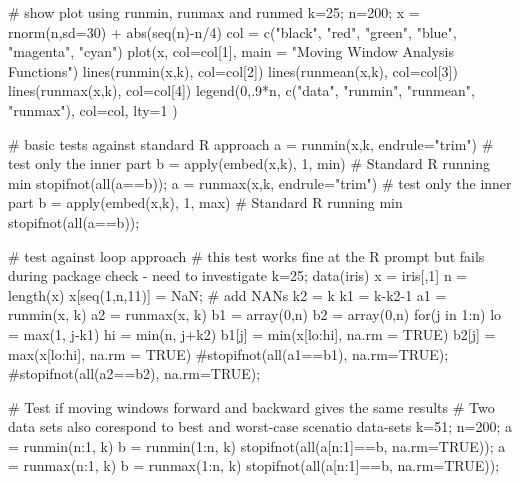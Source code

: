 \begin{Examples}
\begin{ExampleCode}
  # show plot using runmin, runmax and runmed
  k=25; n=200;
  x = rnorm(n,sd=30) + abs(seq(n)-n/4)
  col = c("black", "red", "green", "blue", "magenta", "cyan")
  plot(x, col=col[1], main = "Moving Window Analysis Functions")
  lines(runmin(x,k), col=col[2])
  lines(runmean(x,k), col=col[3])
  lines(runmax(x,k), col=col[4])
  legend(0,.9*n, c("data", "runmin", "runmean", "runmax"), col=col, lty=1 )

  # basic tests against standard R approach
  a = runmin(x,k, endrule="trim") # test only the inner part 
  b = apply(embed(x,k), 1, min)   # Standard R running min
  stopifnot(all(a==b));
  a = runmax(x,k, endrule="trim") # test only the inner part
  b = apply(embed(x,k), 1, max)   # Standard R running min
  stopifnot(all(a==b));
  
  # test against loop approach
  # this test works fine at the R prompt but fails during package check - need to investigate
  k=25; 
  data(iris)
  x = iris[,1]
  n = length(x)
  x[seq(1,n,11)] = NaN;                # add NANs
  k2 = k
  k1 = k-k2-1
  a1 = runmin(x, k)
  a2 = runmax(x, k)
  b1 = array(0,n)
  b2 = array(0,n)
  for(j in 1:n) {
    lo = max(1, j-k1)
    hi = min(n, j+k2)
    b1[j] = min(x[lo:hi], na.rm = TRUE)
    b2[j] = max(x[lo:hi], na.rm = TRUE)
  }
  #stopifnot(all(a1==b1), na.rm=TRUE);
  #stopifnot(all(a2==b2), na.rm=TRUE);
  
  # Test if moving windows forward and backward gives the same results
  # Two data sets also corespond to best and worst-case scenatio data-sets
  k=51; n=200;
  a = runmin(n:1, k) 
  b = runmin(1:n, k)
  stopifnot(all(a[n:1]==b, na.rm=TRUE));
  a = runmax(n:1, k)
  b = runmax(1:n, k)
  stopifnot(all(a[n:1]==b, na.rm=TRUE));


\end{ExampleCode}
\end{Examples}
